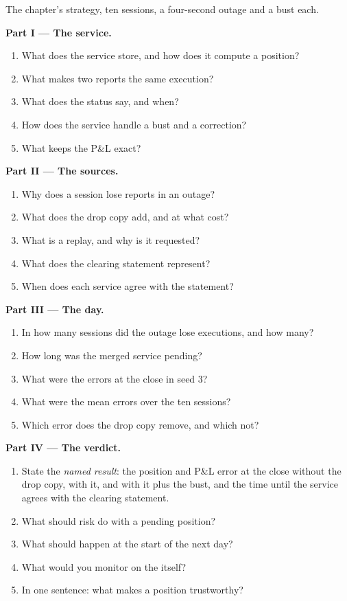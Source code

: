 \begin{problem}\label{pb:pl:position-and-pnl-services:1}
The chapter's strategy, ten sessions, a four-second outage and a bust each.

\medskip\noindent\textbf{Part I --- The service.}
\begin{enumerate}
\item What does the service store, and how does it compute a position?
\item What makes two reports the same execution?
\item What does the status say, and when?
\item How does the service handle a bust and a correction?
\item What keeps the P\&L exact?
\end{enumerate}

\medskip\noindent\textbf{Part II --- The sources.}
\begin{enumerate}[resume]
\item Why does a session lose reports in an outage?
\item What does the drop copy add, and at what cost?
\item What is a replay, and why is it requested?
\item What does the clearing statement represent?
\item When does each service agree with the statement?
\end{enumerate}

\medskip\noindent\textbf{Part III --- The day.}
\begin{enumerate}[resume]
\item In how many sessions did the outage lose executions, and how many?
\item How long was the merged service pending?
\item What were the errors at the close in seed 3?
\item What were the mean errors over the ten sessions?
\item Which error does the drop copy remove, and which not?
\end{enumerate}

\medskip\noindent\textbf{Part IV --- The verdict.}
\begin{enumerate}[resume]
\item State the \emph{named result}: the position and P\&L error at the close without the drop copy, with it, and with it plus the bust, and
the time until the service agrees with the clearing statement.
\item What should risk do with a pending position?
\item What should happen at the start of the next day?
\item What would you monitor on the  itself?
\item In one sentence: what makes a position trustworthy?
\end{enumerate}
\end{problem}

